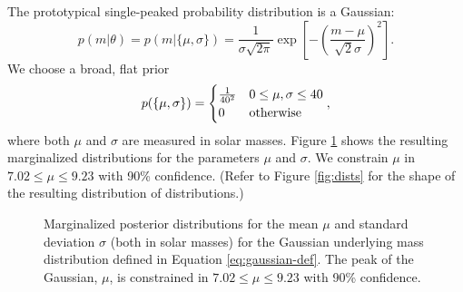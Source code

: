 \documentclass[preprint]{aastex}
\begin{document}
The prototypical single-peaked probability distribution is a
Gaussian:
\begin{equation}
  p(m|\theta) = p(m|\{\mu, \sigma\}) = \frac{1}{\sigma \sqrt{2\pi}}
  \exp\left[ - \left(\frac{m - \mu}{\sqrt{2} \sigma} \right)^2 \right].
\end{equation}
We choose a broad, flat prior 
\begin{equation}
  \label{eq:gaussian-def}
  p(\{\mu,\sigma\}) = 
  \begin{cases}
    \frac{1}{40^2} & 0 \leq \mu, \sigma \leq 40 \\
    0 & \textnormal{otherwise}
  \end{cases},
\end{equation}
where both $\mu$ and $\sigma$ are measured in solar masses.  Figure
\ref{fig:gaussian} shows the resulting marginalized distributions for
the parameters $\mu$ and $\sigma$.  We constrain $\mu$ in $7.02 \leq
\mu \leq 9.23$ with 90\% confidence.  (Refer to Figure \ref{fig:dists}
for the shape of the resulting distribution of distributions.)

\begin{figure}
  \begin{center}
  \end{center}
  \caption{\label{fig:gaussian} Marginalized posterior distributions
    for the mean $\mu$ and standard deviation $\sigma$ (both in solar
    masses) for the Gaussian underlying mass distribution defined in
    Equation \eqref{eq:gaussian-def}.  The peak of the Gaussian,
    $\mu$, is constrained in $7.02 \leq \mu \leq 9.23$ with 90\%
    confidence.}
\end{figure}
\end{document}
